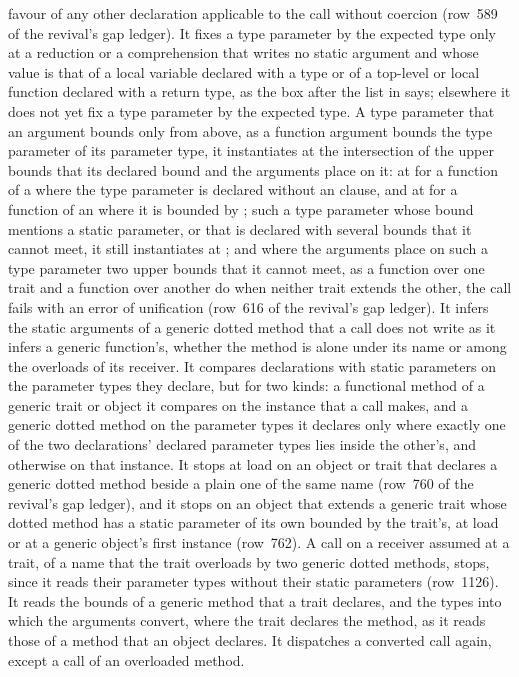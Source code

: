 {favour of any other declaration applicable to the call without coercion
(row~589 of the revival's gap ledger).
It fixes a type parameter by the expected type only at a reduction or a
comprehension that writes no static argument and whose value is that of a
local variable declared with a type or of a top-level or local function
declared with a return type, as the box after the list in
 says; elsewhere it does not yet fix a type parameter
by the expected type.
A type parameter that an argument bounds only from above, as a function
argument bounds the type parameter of its parameter type, it instantiates at the
intersection of the upper bounds that its declared bound and the arguments
place on it: at  for a function of a  where
the type parameter is declared without an  clause, and at
 for a function of an  where it is bounded by
; such a type parameter whose bound mentions a
static parameter, or that is declared with several bounds that it cannot meet,
it still instantiates at ; and where the arguments place on
such a type parameter two upper bounds that it cannot meet, as a function over
one trait and a function over another do when neither trait extends the other,
the call fails with an error of unification (row~616 of the revival's gap ledger).
It infers the static arguments of a generic dotted method that a call does not
write as it infers a generic function's, whether the method is alone under its
name or among the overloads of its receiver.
It compares declarations with static parameters on the parameter types they
declare, but for two kinds: a functional method of a generic trait or object it
compares on the instance that a call makes, and a generic dotted method on the
parameter types it declares only where exactly one of the two declarations'
declared parameter types lies inside the other's, and otherwise on that instance.
It stops at load on an object or trait that declares a generic dotted method
beside a plain one of the same name (row~760 of the revival's gap ledger), and
it stops on an object that extends a generic trait whose dotted method has a
static parameter of its own bounded by the trait's, at load or at a generic
object's first instance (row~762).
A call on a receiver
assumed at a trait, of a name that the trait overloads by two generic dotted
methods, stops, since it reads their parameter types without their static
parameters (row~1126).
It reads the bounds of a generic method that a trait declares, and the types
into which the arguments convert, where the trait declares the method, as it
reads those of a method that an object declares.
It dispatches a converted call again, except a call of an overloaded method.}

